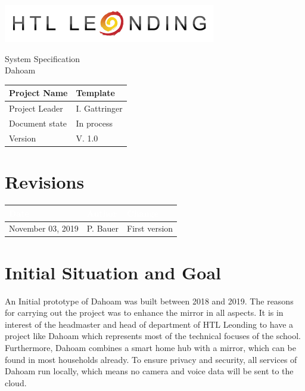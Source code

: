 \documentclass[12pt]{article}
\theoremstyle{definition}
\newcommand{\projectname}{Template}
\newcommand{\productname}{Dahoam}
\newcommand{\projectleader}{I. Gattringer}
\newcommand{\documentstatus}{In process}
\newcommand{\version}{V. 1.0}
\begin{document}
\begin{titlepage}
\begin{flushright}
\includegraphics[scale=.5]{htlleondinglogo.png}\\
\end{flushright}

\vspace{10em}

\begin{center}
{\Huge System Specification} \\[3em]
{\LARGE \productname} \\[3em]
\end{center}

\begin{flushleft}
\begin{tabular}{|l|l|}
\hline
Project Name & \projectname \\ \hline
Project Leader & \projectleader \\ \hline
Document state & \documentstatus \\ \hline
Version & \version \\ \hline
\end{tabular}
\end{flushleft}

\end{titlepage}
\section*{Revisions}
\begin{tabular}{|l|l|l|}
\hline
\cellcolor[gray]{0.5}\textcolor{white}{Date} & \cellcolor[gray]{0.5}\textcolor{white}{Author} & \cellcolor[gray]{0.5}\textcolor{white}{Change} \\ \hline
November 03, 2019&P. Bauer&First version \\ \hline
\end{tabular}
\pagebreak

\tableofcontents
\pagebreak

\section{Initial Situation and Goal}  
An Initial prototype of Dahoam was built between 2018 and 2019. The reasons for carrying out the project was to enhance the mirror in all aspects. It is in interest of the headmaster and head of department of HTL Leonding to have a project like Dahoam which represents most of the technical focuses of the school. \newline
Furthermore, Dahoam combines a smart home hub with a mirror, which can be found in most households already. \newline
To ensure privacy and security, all services of Dahoam run locally, which means no camera and voice data will be sent to the cloud.
\end{document}

